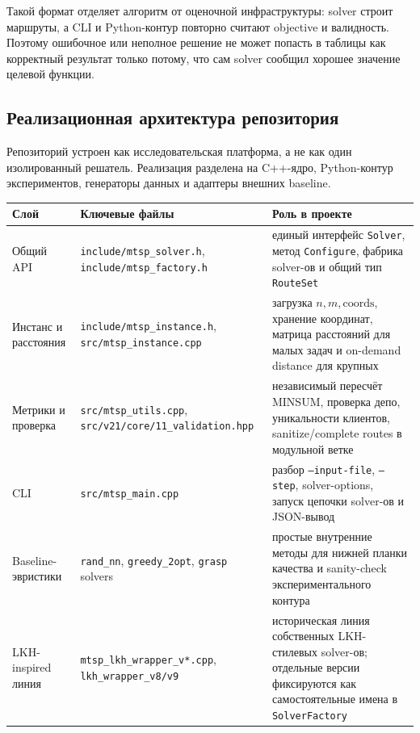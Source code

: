 \documentclass[14pt,a4paper]{extarticle}
\begin{document}
Такой формат отделяет алгоритм от оценочной инфраструктуры: solver строит маршруты, а CLI и Python-контур повторно считают objective и валидность. Поэтому ошибочное или неполное решение не может попасть в таблицы как корректный результат только потому, что сам solver сообщил хорошее значение целевой функции.

\subsection{Реализационная архитектура репозитория}

Репозиторий устроен как исследовательская платформа, а не как один изолированный решатель. Реализация разделена на C++-ядро, Python-контур экспериментов, генераторы данных и адаптеры внешних baseline.

{\scriptsize\setlength{\tabcolsep}{2pt}
\begin{longtable}{>{\raggedright\arraybackslash}p{}>{\raggedright\arraybackslash}p{}>{\raggedright\arraybackslash}p{}}
\toprule
\textbf{Слой} & \textbf{Ключевые файлы} & \textbf{Роль в проекте}\\
\midrule
\endhead
Общий API & \texttt{include/mtsp\_solver.h}, \texttt{include/mtsp\_factory.h} & единый интерфейс \texttt{Solver}, метод \texttt{Configure}, фабрика solver-ов и общий тип \texttt{RouteSet}\\
Инстанс и расстояния & \texttt{include/mtsp\_instance.h}, \texttt{src/mtsp\_instance.cpp} & загрузка $n,m,\mathrm{coords}$, хранение координат, матрица расстояний для малых задач и on-demand distance для крупных\\
Метрики и проверка & \texttt{src/mtsp\_utils.cpp}, \texttt{src/v21/core/11\_validation.hpp} & независимый пересчёт MINSUM, проверка депо, уникальности клиентов, sanitize/complete routes в модульной ветке\\
CLI & \texttt{src/mtsp\_main.cpp} & разбор \texttt{--input-file}, \texttt{--step}, solver-options, запуск цепочки solver-ов и JSON-вывод\\
Baseline-эвристики & \texttt{rand\_nn}, \texttt{greedy\_2opt}, \texttt{grasp} solvers & простые внутренние методы для нижней планки качества и sanity-check экспериментального контура\\
LKH-inspired линия & \texttt{mtsp\_lkh\_wrapper\_v*.cpp}, \texttt{lkh\_wrapper\_v8/v9} & историческая линия собственных LKH-стилевых solver-ов; отдельные версии фиксируются как самостоятельные имена в \texttt{SolverFactory}\\

\end{longtable}}
\end{document}
